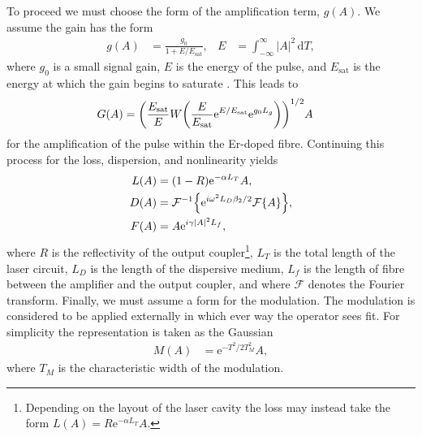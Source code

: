 \documentclass[10pt,twocolumn,a4paper]{article}
\let\originalleft\left
\let\originalright\right
\renewcommand{\left}{\mathopen{}\mathclose\bgroup\originalleft}
\renewcommand{\right}{\aftergroup\egroup\originalright}
\providecommand{\df}{\textrm{d}}
\newcommand{\Es}{E_{\textrm{sat}}}
\newcommand{\FT}[1]{\mathcal{F}\left\{ #1 \right\}}
\newcommand{\FTi}[1]{\mathcal{F}^{-1}\left\{ #1 \right\}}
\begin{document}
To proceed we must choose the form of the amplification term, $g(A)$. We assume the gain has the form
\begin{align}
	g(A) &= \frac{g_0}{1 + E / \Es},& E &= \int_{-\infty}^\infty |A|^2 \, \df T,
	\label{eq:energy}
\end{align}
where $g_0$ is a small signal gain, $E$ is the energy of the pulse, and $\Es$ is the energy at which the gain begins to saturate \cite{bohun, burgoyne2014, haus1975, hausbook, haus1992, haus2000, haus1991, kartner, peng, shtyrina, silfvast, usechak, yarutkina}. This leads to
\begin{align}
	G(A) &= \left( \frac{\Es}{E} W \left( \frac{E}{\Es} \textrm{e}^{E/\Es} \textrm{e}^{g_0 L_g} \right) \right)^{1/2} A
\end{align}
for the amplification of the pulse within the Er-doped fibre. Continuing this process for the loss, dispersion, and nonlinearity yields
\begin{align}
	L(A) &= (1 - R) \textrm{e}^{- \alpha L_T}A, \\
	D(A) &= \FTi{\textrm{e}^{i \omega^2 L_D\beta_2/2} \FT{A}}, \\
	F(A) &= A \textrm{e}^{i \gamma |A|^2 L_f},
\end{align}
where $R$ is the reflectivity of the output coupler\footnote{Depending on the layout of the laser cavity the loss may instead take the form $L(A) = R \textrm{e}^{- \alpha L_T}A$.}, $L_T$ is the total length of the laser circuit, $L_D$ is the length of the dispersive medium, $L_f$ is the length of fibre between the amplifier and the output coupler, and where $\mathcal{F}$ denotes the Fourier transform. Finally, we must assume a form for the modulation. The modulation is considered to be applied externally in which ever way the operator sees fit. For simplicity the representation is taken as the Gaussian
\begin{align}
	M(A) &= \textrm{e}^{-T^2 / 2 T_M^2} A,
\end{align}
where $T_M$ is the characteristic width of the modulation.
\end{document}
